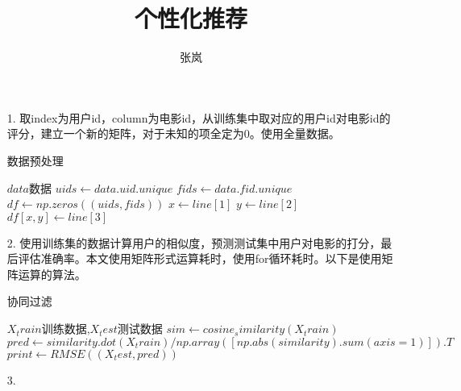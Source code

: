 \documentclass[12pt]{article}
\title{个性化推荐}
\author{张岚}
\begin{document}
\maketitle

\begin{enumerate}
\item[1.] 取index为用户id，column为电影id，从训练集中取对应的用户id对电影id的评分，建立一个新的矩阵，对于未知的项全定为0。使用全量数据。
 \begin{algorithm}
        \caption{数据预处理}
        \begin{algorithmic}[1] %
            \Require $data$数据
                \State $uids \gets data.uid.unique$
                \State $fids \gets data.fid.unique$
                \State $df \gets np.zeros((uids,fids))$
                	    \State $x \gets line[1]$
	    	    \State $y \gets line[2]$
                     \State $df[x,y]  \gets line[3]$
                \EndFor
                \State {}
            \EndFunction    
        \end{algorithmic}
\end{algorithm}

\item[2.] 使用训练集的数据计算用户的相似度，预测测试集中用户对电影的打分，最后评估准确率。本文使用矩阵形式运算耗时，使用for循环耗时。以下是使用矩阵运算的算法。
 \begin{algorithm}
        \caption{协同过滤}
        \begin{algorithmic}[1] %
            \Require $X_train$训练数据,$X_test$测试数据
                \State $sim \gets cosine_similarity(X_train)$
                \State $pred \gets similarity.dot(X_train) / np.array([np.abs(similarity).sum(axis=1)]).T$
                \State $print  \gets RMSE((X_test,pred))$
            \EndFunction    
        \end{algorithmic}
\end{algorithm}

\item[3.] 
\end{enumerate}
\end{document}

